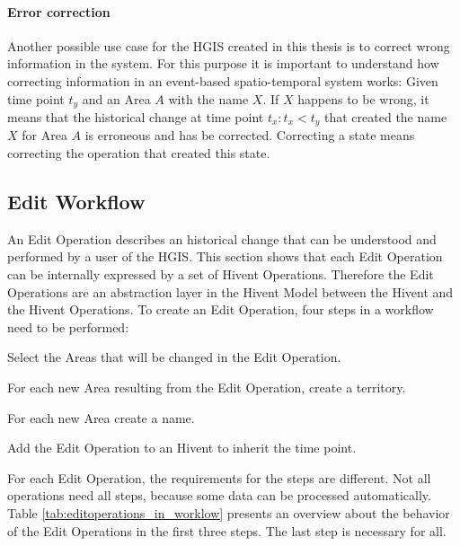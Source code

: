 \paragraph{Error correction} %
\label{par:error_correction}

Another possible use case for the HGIS created in this thesis is to correct wrong information in the system. For this purpose it is important to understand how correcting information in an event-based spatio-temporal system works: Given time point $t_y$ and an Area $A$ with the name $X$. If $X$ happens to be wrong, it means that the historical change at time point $t_x: t_x < t_y$ that created the name $X$ for Area $A$ is erroneous and has be corrected. Correcting a state means correcting the operation that created this state.



\subsection{Edit Workflow} %
\label{sub:edit_workflow}

An Edit Operation describes an historical change that can be understood and performed by a user of the HGIS. This section shows that each Edit Operation can be internally expressed by a set of Hivent Operations. Therefore the Edit Operations are an abstraction layer in the Hivent Model between the Hivent and the Hivent Operations. To create an Edit Operation, four steps in a workflow need to be performed:

\begin{compactenum}
  \item Select the Areas that will be changed in the Edit Operation.
  \item For each new Area resulting from the Edit Operation, create a territory.
  \item For each new Area create a name.
  \item Add the Edit Operation to an Hivent to inherit the time point.
\end{compactenum}

For each Edit Operation, the requirements for the steps are different. Not all operations need all steps, because some data can be processed automatically. Table \ref{tab:editoperations_in_worklow} presents an overview about the behavior of the Edit Operations in the first three steps. The last step is necessary for all.

